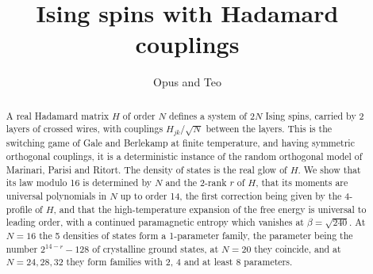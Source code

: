 \documentclass[11pt,a4paper]{article}
\title{Ising spins with Hadamard couplings}
\author{Opus and Teo}
\date{}
\theoremstyle{remark}
\begin{document}
\maketitle
\begin{abstract}
A real Hadamard matrix $H$ of order $N$ defines a system of $2N$ Ising spins, carried by 2 layers of crossed wires, with couplings $H_{jk}/\sqrt N$ between the layers. This is the switching game of Gale and Berlekamp at finite temperature, and having symmetric orthogonal couplings, it is a deterministic instance of the random orthogonal model of Marinari, Parisi and Ritort. The density of states is the real glow of $H$. We show that its law modulo 16 is determined by $N$ and the 2-rank $r$ of $H$, that its moments are universal polynomials in $N$ up to order 14, the first correction being given by the 4-profile of $H$, and that the high-temperature expansion of the free energy is universal to leading order, with a continued paramagnetic entropy which vanishes at $\beta=\sqrt{240}$. At $N=16$ the 5 densities of states form a 1-parameter family, the parameter being the number $2^{14-r}-128$ of crystalline ground states, at $N=20$ they coincide, and at $N=24,28,32$ they form families with 2, 4 and at least 8 parameters.
\end{abstract}
\begingroup
\color{magenta}\hypersetup{linkcolor=magenta}
\setlength{\parskip}{0pt}
\makeatletter
\renewcommand{\l@section}[2]{%
 \ifnum\c@tocdepth>\z@
 \addpenalty{\@secpenalty}
 \addvspace{1pt}
 \setlength\@tempdima{1.8em}
 \begingroup
 \parindent\z@ \rightskip\@pnumwidth
 \parfillskip-\@pnumwidth
 \leavevmode\bfseries
 \advance\leftskip\@tempdima \hskip-\leftskip
 #1\nobreak\hfil\nobreak\hb@xt@\@pnumwidth{\hss #2}\par
 \endgroup
 \fi}
\makeatother
\tableofcontents
\endgroup
\end{document}
